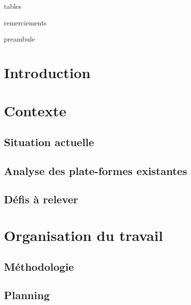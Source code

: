 


\frontmatter

{tables}

{remerciements}

{preambule}

\mainmatter


\chapter{Introduction}

\chapter{Contexte}
\section{Situation actuelle}
\section{Analyse des plate-formes existantes}
\section{Défis à relever}

\chapter{Organisation du travail}
\section{Méthodologie}
\section{Planning}
